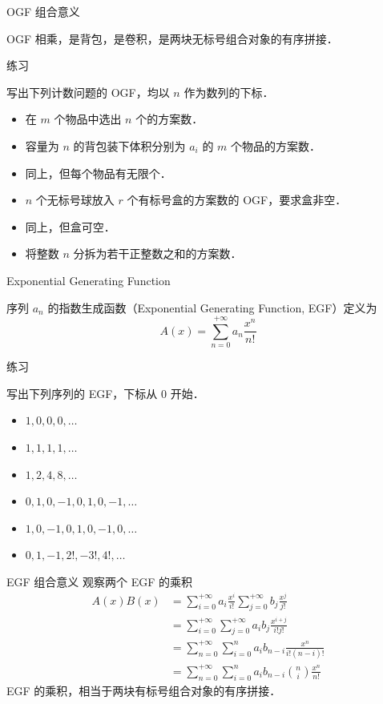 \documentclass[fontset=fandol]{ctexbeamer}
\begin{document}
\begin{frame}{OGF 组合意义}

OGF 相乘，是背包，是卷积，是两块无标号组合对象的有序拼接．

\begin{exampleblock}{练习}

写出下列计数问题的 OGF，均以 $n$ 作为数列的下标．

\begin{itemize}
    \item 在 $m$ 个物品中选出 $n$ 个的方案数．
    \item 容量为 $n$ 的背包装下体积分别为 $a_i$ 的 $m$ 个物品的方案数．
    \item 同上，但每个物品有无限个．
    \item $n$ 个无标号球放入 $r$ 个有标号盒的方案数的 OGF，要求盒非空．
    \item 同上，但盒可空．
    \item 将整数 $n$ 分拆为若干正整数之和的方案数．
\end{itemize}

\end{exampleblock}

\end{frame}

\begin{frame}{Exponential Generating Function}

序列 $a_n$ 的指数生成函数（Exponential Generating Function, EGF）定义为
\[
A(x) = \sum_{n=0}^{+\infty} a_n \frac {x^n}{n!}
\]

\begin{exampleblock}{练习}

写出下列序列的 EGF，下标从 $0$ 开始．

\begin{itemize}
    \item $1,0,0,0,\dots$
    \item $1,1,1,1,\dots$
    \item $1,2,4,8,\dots$
    \item $0,1,0,-1,0,1,0,-1,\dots$
    \item $1,0,-1,0,1,0,-1,0,\dots$
    \item $0,1,-1,2!,-3!,4!,\dots$
\end{itemize}

\end{exampleblock}

\end{frame}

\begin{frame}{EGF 组合意义}
观察两个 EGF 的乘积
\[
\begin{aligned}
A(x) B(x) &= \sum_{i=0}^{+\infty} a_i \frac{x^i}{i!} \sum_{j=0}^{+\infty} b_j \frac{x^j}{j!} \\
&= \sum_{i=0}^{+\infty} \sum_{j=0}^{+\infty} a_i b_j \frac{x^{i+j}}{i! j!} \\
&= \sum_{n=0}^{+\infty} \sum_{i=0}^n a_i b_{n-i} \frac{x^n}{i! (n-i)!} \\
&= \sum_{n=0}^{+\infty} \sum_{i=0}^n a_i b_{n-i} \binom n i \frac{x^n}{n!}
\end{aligned}
\]
EGF 的乘积，相当于两块有标号组合对象的有序拼接．
\end{frame}
\end{document}
